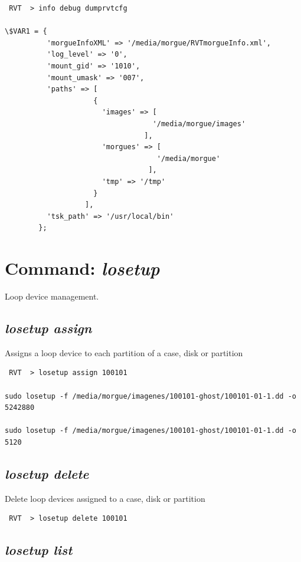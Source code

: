 \documentclass[a4paper,11pt,oneside]{report}
\begin{document}
\begin{verbatim}
 RVT  > info debug dumprvtcfg                                                 

\$VAR1 = {
          'morgueInfoXML' => '/media/morgue/RVTmorgueInfo.xml',
          'log_level' => '0',
          'mount_gid' => '1010',
          'mount_umask' => '007',
          'paths' => [
                     {
                       'images' => [
                                   '/media/morgue/images'
                                 ],
                       'morgues' => [
                                    '/media/morgue'
                                  ],
                       'tmp' => '/tmp'
                     }
                   ],
          'tsk_path' => '/usr/local/bin'
        };
\end{verbatim}






\section{Command: \emph{losetup}}

Loop device management.

\subsection{\emph{losetup assign}}

Assigns a loop device to each partition of a case, disk or partition

\begin{verbatim}
 RVT  > losetup assign 100101

sudo losetup -f /media/morgue/imagenes/100101-ghost/100101-01-1.dd -o 5242880

sudo losetup -f /media/morgue/imagenes/100101-ghost/100101-01-1.dd -o 5120
\end{verbatim}


\subsection{\emph{losetup delete}}

Delete loop devices assigned to a case, disk or partition

\begin{verbatim}
 RVT  > losetup delete 100101
\end{verbatim}


\subsection{\emph{losetup list}}
\end{document}
